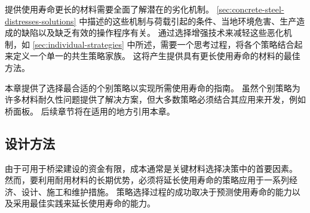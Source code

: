 提供使用寿命更长的材料需要全面了解潜在的{劣化}机制。 \cref{sec:concrete-steel-distresses-solutions} 中描述的这些机制与荷载引起的条件、当地环境危害、生产造成的缺陷以及缺乏有效的操作程序有关。 通过选择增强技术来减轻这些恶化机制，如 \cref{sec:individual-strategies} 中所述，需要一个思考过程，将各个策略结合起来定义一个单一的共生策略家族。 这将产生提供具有更长使用寿命的材料的最佳方法。

本章提供了选择最合适的个别策略以实现所需使用寿命的指南。 虽然个别策略为许多材料耐久性问题提供了解决方案，但大多数策略必须结合其应用来开发，例如桥面板。 后续章节将在适用的地方引用本章。

\subsection{设计方法}
由于可用于桥梁建设的资金有限，成本通常是关键材料选择决策中的首要因素。 然而，要利用耐用材料的长期优势，必须将延长使用寿命的策略应用于一系列经济、设计、施工和维护措施。 策略选择过程的成功取决于预测使用寿命的能力以及采用最佳实践来延长使用寿命的能力。

